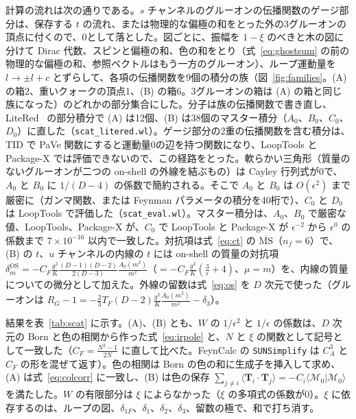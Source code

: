 \documentclass[a4paper,10pt]{ltjsarticle}
\newcommand{\MSbar}{\overline{\mathrm{MS}}}
\begin{document}
計算の流れは次の通りである。$s$ チャンネルのグルーオンの伝播関数のゲージ部分は、保存する $t$ の流れ、または物理的な偏極の和をとった外の3グルーオンの頂点に付くので、0として落とした。図ごとに、振幅を $1-\xi$ のべきと木の図に分けて Dirac 代数、スピンと偏極の和、色の和をとり（式~\eqref{eq:ghostsum} の前の物理的な偏極の和、参照ベクトルはもう一方のグルーオン）、ループ運動量を $l\to\pm l+c$ とずらして、各項の伝播関数を9個の積分の族（図~\ref{fig:families}。(A) の箱2、重いクォークの頂点1、(B) の箱6。3グルーオンの箱は (A) の箱と同じ族になった）のどれかの部分集合にした。分子は族の伝播関数で書き直し、LiteRed~\cite{lee12,lee14} の部分積分で (A) は12個、(B) は38個のマスター積分（$A_0$、$B_0$、$C_0$、$D_0$）に直した（\texttt{scat\_litered.wl}）。ゲージ部分の2重の伝播関数を含む積分は、TID で PaVe 関数にすると運動量0の辺を持つ関数になり、LoopTools と Package-X では評価できないので、この経路をとった。軟らかい三角形（質量のないグルーオンが二つの on-shell の外線を結ぶもの）は Cayley 行列式が0で、$A_0$ と $B_0$ に $1/(D-4)$ の係数で簡約される。そこで $A_0$ と $B_0$ は $O(\epsilon^2)$ まで厳密に（ガンマ関数、または Feynman パラメータの積分を40桁で）、$C_0$ と $D_0$ は LoopTools で評価した（\texttt{scat\_eval.wl}）。マスター積分は、$A_0$、$B_0$ で厳密な値、LoopTools、Package-X が、$C_0$ で LoopTools と Package-X が $\epsilon^{-2}$ から $\epsilon^0$ の係数まで $7\times10^{-16}$ 以内で一致した。対抗項は式~\eqref{eq:ct} の $\MSbar$（$n_f=6$）で、(B) の $t$、$u$ チャンネルの内線の $t$ には on-shell の質量の対抗項 $\delta_m^{\mathrm{OS}}=-C_F\frac{g^2}{K}\frac{(D-1)(D-2)}{2(D-3)}\frac{A_0(m^2)}{m^2}$（$=-C_F\frac{g^2}{K}(\frac3\epsilon+4)$、$\mu=m$）を、内線の質量についての微分として加えた。外線の留数は式~\eqref{eq:os} を $D$ 次元で使った（グルーオンは $R_G-1=-\frac23T_F(D-2)\frac{g^2}{K}\frac{A_0(m^2)}{m^2}-\delta_3$）。

結果を表~\ref{tab:scat} に示す。(A)、(B) とも、$W$ の $1/\epsilon^2$ と $1/\epsilon$ の係数は、$D$ 次元の Born と色の相関から作った式~\eqref{eq:irpole} と、$N$ と $\xi$ の関数として記号として一致した（$C_F=\frac{N^2-1}{2N}$ に直して比べた。FeynCalc の \texttt{SUNSimplify} は $C_A^3$ と $C_F$ の形を混ぜて返す）。色の相関は Born の色の和に生成子を挿入して求め、(A) は式~\eqref{eq:colcorr} に一致し、(B) は色の保存 $\sum_{j\ne i}\langle\boldsymbol T_i\cdot\boldsymbol T_j\rangle=-C_i\langle\mathcal M_0|\mathcal M_0\rangle$ を満たした。$W$ の有限部分は $\xi$ によらなかった（$\xi$ の多項式の係数が0）。$\xi$ に依存するのは、ループの図、$\delta_{1F}$、$\delta_1$、$\delta_2$、$\delta_3$、留数の極で、和で打ち消す。
\end{document}
